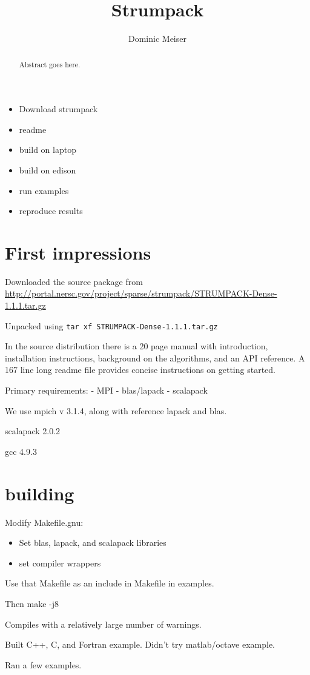 \documentclass{acmsmall}
\begin{document}
\title{Strumpack}
\author{Dominic Meiser
}


\begin{abstract}
Abstract goes here.
\end{abstract}

\maketitle 

\begin{itemize}
  \item Download strumpack
  \item readme
  \item build on laptop
  \item build on edison
  \item run examples
  \item reproduce results

\end{itemize}

\section{First impressions}

Downloaded the source package from
\url{http://portal.nersc.gov/project/sparse/strumpack/STRUMPACK-Dense-1.1.1.tar.gz}

Unpacked using \verb!tar xf STRUMPACK-Dense-1.1.1.tar.gz!

In the source distribution there is a 20 page manual with
introduction, installation instructions, background on the
algorithms, and an API reference.  A 167 line long readme file
provides concise instructions on getting started.

Primary requirements:
- MPI
- blas/lapack
- scalapack

We use mpich v 3.1.4, along with reference lapack and blas.

scalapack 2.0.2

gcc 4.9.3


\section{building}

Modify Makefile.gnu:
\begin{itemize}
\item Set blas, lapack, and scalapack libraries
\item set compiler wrappers
\end{itemize}

Use that Makefile as an include in Makefile in examples.

Then make -j8


Compiles with a relatively large number of warnings.

Built C++, C, and Fortran example.  Didn't try matlab/octave example.

Ran a few examples.
\end{document}
